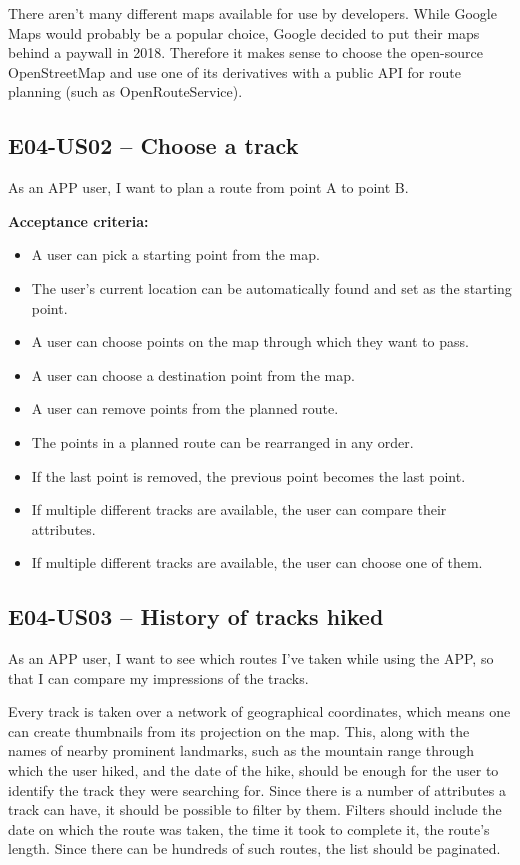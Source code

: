 There aren't many different maps available for use by developers.
While Google Maps would probably be a popular choice, Google decided to put their maps behind a paywall\cite{google-maps-paywall} in 2018.
Therefore it makes sense to choose the open-source OpenStreetMap\cite{OpenStreetMap} and use one of its derivatives with a public API for route planning (such as OpenRouteService\cite{OpenRouteService}).

\subsection*{E04-US02 -- Choose a track}
As an APP user, I want to plan a route from point A to point B.

\textbf{Acceptance criteria:}
\begin{itemize}
    \item A user can pick a starting point from the map.
    \item The user's current location can be automatically found and set as the starting point.
    \item A user can choose points on the map through which they want to pass.
    \item A user can choose a destination point from the map.
    \item A user can remove points from the planned route.
    \item The points in a planned route can be rearranged in any order.
    \item If the last point is removed, the previous point becomes the last point.
    \item If multiple different tracks are available, the user can compare their attributes.
    \item If multiple different tracks are available, the user can choose one of them.
\end{itemize}

\subsection*{E04-US03 -- History of tracks hiked}
As an APP user, I want to see which routes I've taken while using the APP, so that I can compare my impressions of the tracks.

Every track is taken over a network of geographical coordinates, which means one can create thumbnails from its projection on the map.
This, along with the names of nearby prominent landmarks, such as the mountain range through which the user hiked, and the date of the hike, should be enough for the user to identify the track they were searching for.
Since there is a number of attributes a track can have, it should be possible to filter by them.
Filters should include the date on which the route was taken, the time it took to complete it, the route's length.
Since there can be hundreds of such routes, the list should be paginated.


